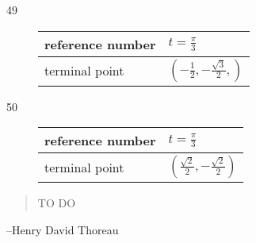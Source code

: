 \documentclass{exam}
\begin{document}
\begin{description}
      \item[49]
        \begin{tabular}[H]{ll}
          \toprule
          reference number & $t = \frac{\pi}{3}$ \\
          \midrule
          terminal point   & $\left( - \frac{1}{2}, - \frac{\sqrt{3}}{2},  \right)$ \\
          \bottomrule
        \end{tabular}

      \item[50]
        \begin{tabular}[H]{ll}
          \toprule
          reference number & $t = \frac{\pi}{3}$ \\
          \midrule
          terminal point   & $\left( \frac{\sqrt{2}}{2}, - \frac{\sqrt{2}}{2} \right)$ \\
          \bottomrule
        \end{tabular}

    \end{description}
  \else
    \vspace{1 cm}
    \begin{quote}
      \begin{em}
        TO DO
      \end{em}
    \end{quote}
    \hspace{1 cm} --Henry David Thoreau
  \fi
\end{document}
